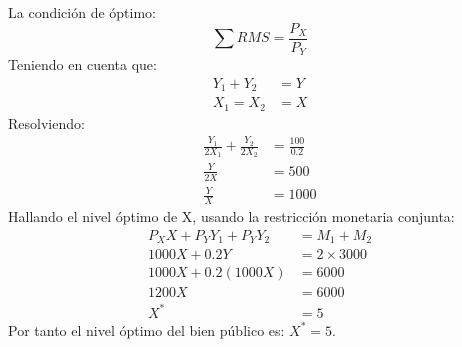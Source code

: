 La condición de óptimo:
		$$\sum RMS = \frac{P_{X}}{P_{Y}}$$
Teniendo en cuenta que:
	\begin{align*}
		Y_{1} + Y_{2} &= Y\\
		X_{1} = X_{2} &= X
	\end{align*}
Resolviendo:
	\begin{align*}
		\frac{Y_{1}}{2X_{1}} + \frac{Y_{2}}{2X_{2}} &= \frac{100}{0.2}\\
		\frac{Y}{2X} &= 500\\
		\frac{Y}{X} &= 1000
	\end{align*}
Hallando el nivel óptimo de X, usando la restricción monetaria conjunta:
	\begin{align*}
		P_{X}X + P_{Y}Y_{1} + P_{Y}Y_{2} &= M_{1} + M_{2}\\
		1000X + 0.2Y &= 2 \times 3000\\
		1000X + 0.2\left(1000X\right) &= 6000\\
		1200X &= 6000\\
		X^* &= 5
	\end{align*}
Por tanto el nivel óptimo del bien público es: $X^* = 5$.